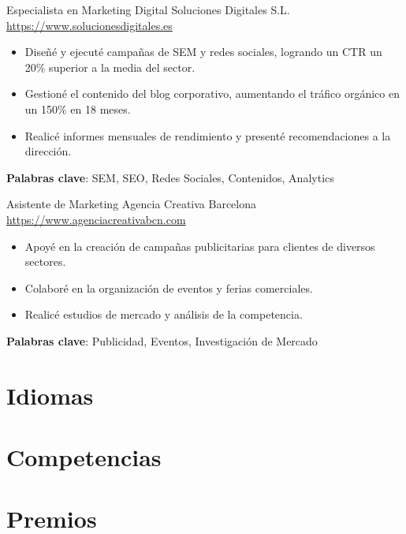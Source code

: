 \documentclass[a4paper, serif, 10pt]{moderncv}
\begin{document}
        {Especialista en Marketing Digital}
        {Soluciones Digitales S.L.}
        {\url{https://www.solucionesdigitales.es}}
        {}
        {\begin{itemize}
\item Diseñé y ejecuté campañas de SEM y redes sociales, logrando un CTR un 20\% superior a la media del sector.
\item Gestioné el contenido del blog corporativo, aumentando el tráfico orgánico en un 150\% en 18 meses.
\item Realicé informes mensuales de rendimiento y presenté recomendaciones a la dirección.
\end{itemize}
\textbf{Palabras clave}: SEM, SEO, Redes Sociales, Contenidos, Analytics}

        {Asistente de Marketing}
        {Agencia Creativa Barcelona}
        {\url{https://www.agenciacreativabcn.com}}
        {}
        {\begin{itemize}
\item Apoyé en la creación de campañas publicitarias para clientes de diversos sectores.
\item Colaboré en la organización de eventos y ferias comerciales.
\item Realicé estudios de mercado y análisis de la competencia.
\end{itemize}
\textbf{Palabras clave}: Publicidad, Eventos, Investigación de Mercado}
\section{Idiomas}

\section{Competencias}

\section{Premios}
\end{document}

